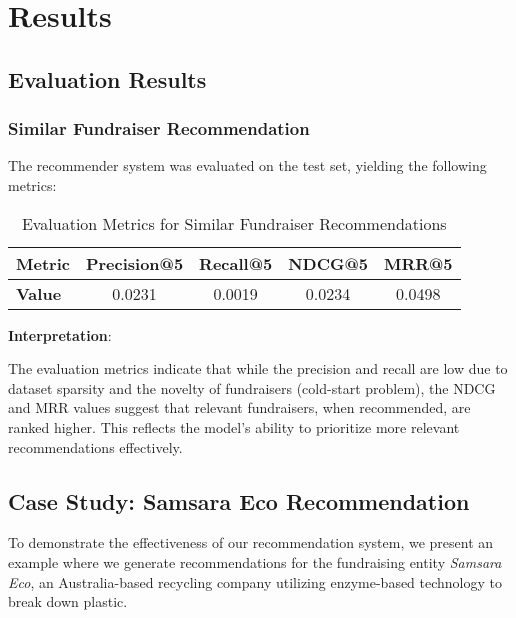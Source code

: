 \documentclass[sigconf]{acmart}
\begin{document}
\section{Results}

\subsection{Evaluation Results}

\subsubsection{Similar Fundraiser Recommendation}

The recommender system was evaluated on the test set, yielding the following metrics:

\begin{table}[htpb]
    \centering
    \caption{Evaluation Metrics for Similar Fundraiser Recommendations}
    \label{tab:evaluation_metrics}
    \begin{tabular}{lcccc}
        \toprule
        \textbf{Metric} & \textbf{Precision@5} & \textbf{Recall@5} & \textbf{NDCG@5} & \textbf{MRR@5} \\
        \midrule
        \textbf{Value} & 0.0231 & 0.0019 & 0.0234 & 0.0498 \\
        \bottomrule
    \end{tabular}
\end{table}

\textbf{Interpretation}:

The evaluation metrics indicate that while the precision and recall are low due to dataset sparsity and the novelty of fundraisers (cold-start problem), the NDCG and MRR values suggest that relevant fundraisers, when recommended, are ranked higher. This reflects the model's ability to prioritize more relevant recommendations effectively.

\subsection{Case Study: Samsara Eco Recommendation}

To demonstrate the effectiveness of our recommendation system, we present an example where we generate recommendations for the fundraising entity \textit{Samsara Eco}, an Australia-based recycling company utilizing enzyme-based technology to break down plastic.
\end{document}
